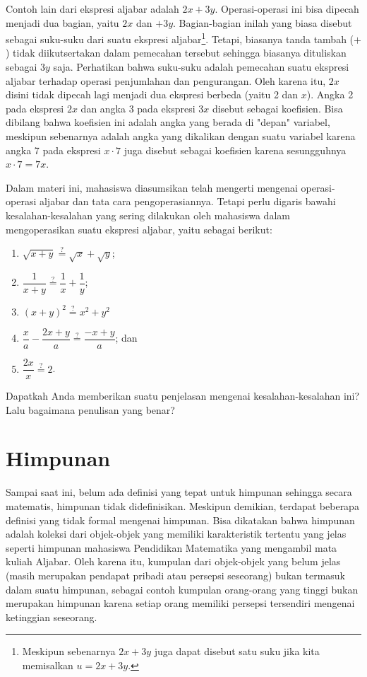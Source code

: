 \par Contoh lain dari ekspresi aljabar adalah $ 2x + 3y $. Operasi-operasi ini bisa dipecah menjadi dua bagian, yaitu $ 2x $ dan $ + 3y $. Bagian-bagian inilah yang biasa disebut sebagai suku-suku dari suatu ekspresi aljabar\footnote{Meskipun sebenarnya $ 2x + 3y $ juga dapat disebut satu suku jika kita memisalkan $ u = 2x + 3y $.}. Tetapi, biasanya tanda tambah ($ + $) tidak diikutsertakan dalam pemecahan tersebut sehingga biasanya dituliskan sebagai $ 3y $ saja. Perhatikan bahwa suku-suku adalah pemecahan suatu ekspresi aljabar terhadap operasi penjumlahan dan pengurangan. Oleh karena itu, $ 2x $ disini tidak dipecah lagi menjadi dua ekspresi berbeda (yaitu 2 dan $ x $). Angka 2 pada ekspresi $ 2x $ dan angka 3 pada ekspresi $ 3x $ disebut sebagai koefisien. Bisa dibilang bahwa koefisien ini adalah angka yang berada di "depan" variabel, meskipun sebenarnya adalah angka yang dikalikan dengan suatu variabel karena angka 7 pada ekspresi $ x \cdot 7 $ juga disebut sebagai koefisien karena sesungguhnya $ x \cdot 7 = 7x $.

\par Dalam materi ini, mahasiswa diasumsikan telah mengerti mengenai operasi-operasi aljabar dan tata cara pengoperasiannya. Tetapi perlu digaris bawahi kesalahan-kesalahan yang sering dilakukan oleh mahasiswa dalam mengoperasikan suatu ekspresi aljabar, yaitu sebagai berikut:
\begin{enumerate}
	\item $ \sqrt{x + y} \stackrel{?}{=} \sqrt{x} + \sqrt{y} $;
	\item $ \dfrac{1}{x + y} \stackrel{?}{=} \dfrac{1}{x} + \dfrac{1}{y} $;
	\item $ \left(x + y\right)^{2} \stackrel{?}{=} x^{2} + y^{2} $
	\item $ \dfrac{x}{a} - \dfrac{2x + y}{a} \stackrel{?}{=} \dfrac{-x + y}{a} $; dan
	\item $ \dfrac{2x}{x} \stackrel{?}{=} 2 $.
\end{enumerate}

\begin{explbox}
	Dapatkah Anda memberikan suatu penjelasan mengenai kesalahan-kesalahan ini? Lalu bagaimana penulisan yang benar?
\end{explbox}

\section{Himpunan}

Sampai saat ini, belum ada definisi yang tepat untuk himpunan sehingga secara matematis, himpunan tidak didefinisikan. Meskipun demikian, terdapat beberapa definisi yang tidak formal mengenai himpunan. Bisa dikatakan bahwa himpunan adalah koleksi dari objek-objek yang memiliki karakteristik tertentu yang jelas seperti himpunan mahasiswa Pendidikan Matematika yang mengambil mata kuliah Aljabar. Oleh karena itu, kumpulan dari objek-objek yang belum jelas (masih merupakan pendapat pribadi atau persepsi seseorang) bukan termasuk dalam suatu himpunan, sebagai contoh kumpulan orang-orang yang tinggi bukan merupakan himpunan karena setiap orang memiliki persepsi tersendiri mengenai ketinggian seseorang.

